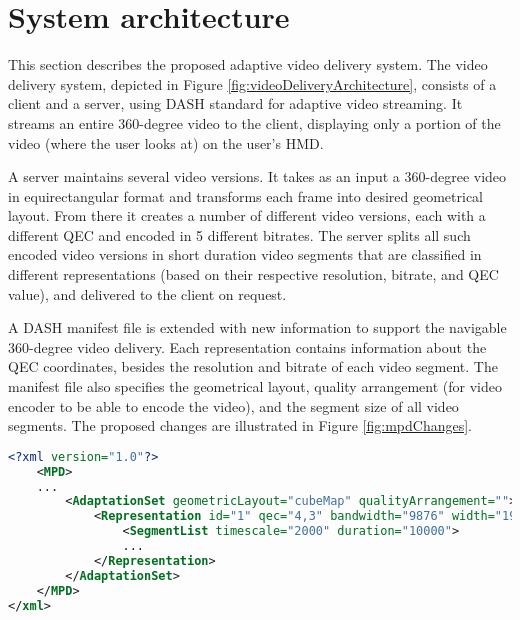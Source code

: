 \section{System architecture}

This section describes the proposed adaptive video delivery system. The video delivery system, depicted in Figure \ref{fig:videoDeliveryArchitecture}, consists of a client and a server, using DASH standard \cite{Stockhammer11} for adaptive video streaming. It streams an entire 360-degree video to the client, displaying only a portion of the video (where the user looks at) on the user's HMD.



A server maintains several video versions. It takes as an input a 360-degree video in equirectangular format and transforms each frame into desired geometrical layout. From there it creates a number of different video versions, each with a different QEC and encoded in 5 different bitrates. The server splits all such encoded video versions in short duration video segments that are classified in different representations (based on their respective resolution, bitrate, and QEC value), and delivered to the client on request.

A DASH manifest file is extended with new information to support the navigable 360-degree video delivery. Each representation contains information about the QEC coordinates, besides the resolution and bitrate of each video segment. The manifest file also specifies the geometrical layout, quality arrangement (for video encoder to be able to encode the video), and the segment size of all video segments. The proposed changes are illustrated in Figure \ref{fig:mpdChanges}.

\begin{lstlisting}[language=xml, frame=single, backgroundcolor=\color{white}, caption=Extensions of MPD file]
<?xml version="1.0"?>
    <MPD>
    ...
        <AdaptationSet geometricLayout="cubeMap" qualityArrangement="">
            <Representation id="1" qec="4,3" bandwidth="9876" width="1920" height="1080" frameRate="30">
                <SegmentList timescale="2000" duration="10000">
                ...
            </Representation>
        </AdaptationSet>
    </MPD>
</xml>
\end{lstlisting}
\label{fig:mpdChanges}


